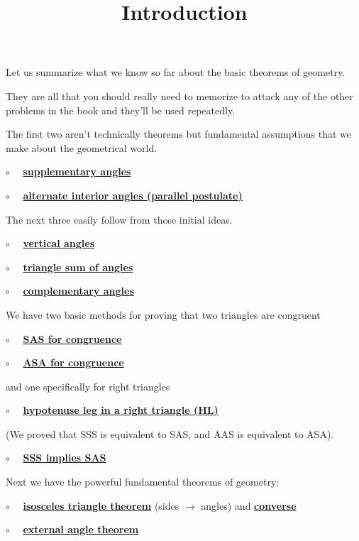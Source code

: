 \documentclass[11pt, oneside]{article}
\title{Introduction}
\date{}
\begin{document}
\maketitle
\Large


Let us summarize what we know so far about the basic theorems of geometry.  

They are all that you should really need to memorize to attack any of the other problems in the book and they'll be used repeatedly.

The first two aren't technically theorems but fundamental assumptions that we make about the geometrical world.

$\circ$ \ \ \hyperref[sec:supplementary_angle_theorem]{\textbf{supplementary angles}}

$\circ$ \ \  \hyperref[sec:alternate_interior_angle_theorem]{\textbf{alternate interior angles (parallel postulate)}}

The next three easily follow from those initial ideas.

$\circ$ \ \ \hyperref[sec:vertical_angle_theorem]{\textbf{vertical angles}}

$\circ$ \ \  \hyperref[sec:triangle_sum_theorem]{\textbf{triangle sum of angles}}

$\circ$ \ \ \hyperref[sec:complementary_angle_theorem]{\textbf{complementary angles}}

We have two basic methods for proving that two triangles are congruent

$\circ$ \ \ \hyperref[sec:SAS]{\textbf{SAS for congruence}}

$\circ$ \ \ \hyperref[sec:ASA]{\textbf{ASA for congruence}}

and one specifically for right triangles

$\circ$ \ \ \hyperref[sec:SSA_in_right]{\textbf{hypotenuse leg in a right triangle (HL)}}

(We proved that SSS is equivalent to SAS, and AAS is equivalent to ASA).

$\circ$ \ \ \hyperref[sec:SSS_implies_SAS]{\textbf{SSS implies SAS}}

Next we have the powerful fundamental theorems of geometry:

$\circ$ \ \  \hyperref[sec:isosceles_triangle_theorem]{\textbf{isosceles triangle theorem}} (sides $\rightarrow$ angles) and \hyperref[sec:isosceles_converse]{\textbf{converse}}

$\circ$ \ \ \hyperref[sec:external_angle_theorem]{\textbf{external angle theorem}}
\end{document}
